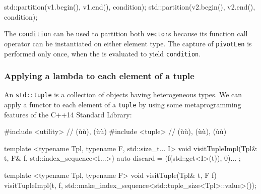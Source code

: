{\begin{emcppslisting}[emcppsstandards={c++14}]
{    std::partition(v1.begin(), v1.end(), condition);
    std::partition(v2.begin(), v2.end(), condition);
}
\end{emcppslisting}
    

\noindent The \lstinline!condition!  can be used to partition
both \lstinline!vector!s because its function call operator can be
instantiated on either element type. The capture of \lstinline!pivotLen! is
performed only once, when the  is evaluated to
yield \lstinline!condition!.

\subsubsection[Applying a lambda to each element of a tuple]{Applying a lambda to each element of a tuple}\label{applying-a-lambda-to-each-element-of-a-tuple}

An \lstinline!std::tuple! is a collection of objects having heterogeneous
types. We can apply a functor to each element of a \lstinline!tuple! by
using some metaprogramming features of the C++14 Standard Library:

\begin{emcppslisting}[emcppsbatch=e4,emcppsstandards={c++14}]
#include <utility>  // (ù{}ù), (ù{}ù)
#include <tuple>    // (ù{}ù), (ù{}ù), (ù{}ù)

template <typename Tpl, typename F, std::size_t... I>
void visitTupleImpl(Tpl& t, F& f, std::index_sequence<I...>)
{
    auto discard = { (f(std::get<I>(t)), 0)... };
}

template <typename Tpl, typename F>
void visitTuple(Tpl& t, F f)
{
    visitTupleImpl(t, f,
                   std::make_index_sequence<std::tuple_size<Tpl>::value>());
}
\end{emcppslisting}
    

}
